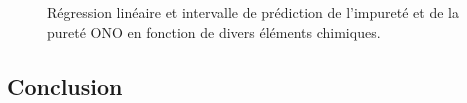 \documentclass[12pt]{article}
\begin{document}
\begin{figure}[H]
{\begin{minipage}{0.8\textwidth}
        \end{minipage}
    }
    \caption{Régression linéaire et intervalle de prédiction de l'impureté et de la pureté ONO en fonction de divers éléments chimiques.}
    \label{fig:regression2}
\end{figure}

























\subsection{Conclusion}
\end{document}

